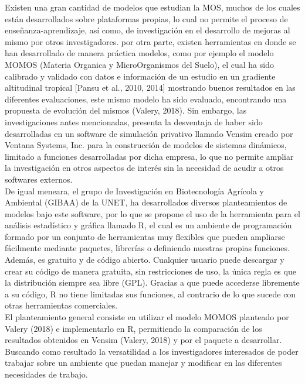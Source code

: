 Existen una gran cantidad de modelos que estudian la MOS, muchos de los cuales están desarrollados sobre plataformas propias, lo cual no permite el proceso de enseñanza-aprendizaje, así como, de investigación en el desarrollo de mejoras al mismo por otros investigadores. por otra parte, existen herramientas en donde se han desarrollado de manera práctica modelos, como por ejemplo el modelo MOMOS (Materia Organica y MicroOrganismos del Suelo), el cual ha sido calibrado y validado con datos e información de un estudio en un gradiente altitudinal tropical [Pansu et al., 2010, 2014] mostrando buenos resultados en las diferentes evaluaciones, este mismo modelo ha sido evaluado, encontrando una propuesta de evolución del mismos (Valery, 2018). Sin embargo, las investigaciones antes mencionadas, presenta la desventaja de haber sido desarrolladas en un software de simulación privativo llamado Vensim creado por Ventana Systems, Inc. para la construcción de modelos de sistemas dinámicos, limitado a funciones desarrolladas por dicha empresa, lo que no permite ampliar la investigación en otros aspectos de interés sin la necesidad de acudir a otros softwares externos.\\

De igual meneara, el grupo de Investigación en Biotecnología Agrícola y Ambiental (GIBAA) de la UNET, ha desarrollados diversos planteamientos de modelos bajo este software, por lo que se propone el uso de la herramienta para el análisis estadístico y gráfica llamado R, el cual es un ambiente de programación formado por un conjunto de herramientas muy flexibles que pueden ampliarse fácilmente mediante paquetes, librerías o definiendo nuestras propias funciones. Además, es gratuito y de código abierto. Cualquier usuario puede descargar y crear su código de manera gratuita, sin restricciones de uso, la única regla es que la distribución siempre sea libre (GPL). Gracias a que puede accederse libremente a su código, R no tiene limitadas sus funciones, al contrario de lo que sucede con otras herramientas comerciales. \\

El planteamiento general consiste en utilizar el modelo MOMOS planteado por Valery (2018) e implementarlo en R, permitiendo la comparación de los resultados obtenidos en Vensim (Valery, 2018) y por el paquete a desarrollar. Buscando como resultado la versatilidad a los investigadores interesados de poder trabajar sobre un ambiente que puedan manejar y modificar en las diferentes necesidades de trabajo.\\




